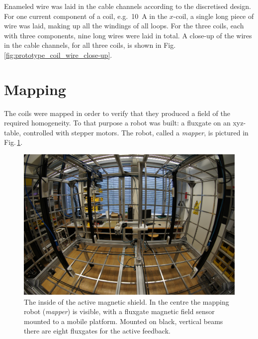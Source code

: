 Enameled wire was laid in the cable channels according to the discretised design.
For one current component of a coil, e.g.\ \SI[detect-all = true]{10}{\ampere} in the $x$-coil, a single long piece of wire was laid, making up all the windings of all loops.
For the three coils, each with three components, nine long wires were laid in total.
A close-up of the wires in the cable channels, for all three coils, is shown in Fig.\,\ref{fig:prototype_coil_wire_close-up}.




\section{Mapping}
\label{sec:prototype_mapping}
The coils were mapped in order to verify that they produced a field of the required homogeneity.
To that purpose a robot was built: a fluxgate on an xyz-table, controlled with stepper motors.
The robot, called a \emph{mapper}, is pictured in Fig.\,\ref{fig:prototype_photo_inside}.

\begin{figure}
  \centering
  \includegraphics[width=0.75\linewidth]{gfx/prototype/prototype_photo_inside.jpg}
  \caption{The inside of the active magnetic shield. In the centre the mapping robot (\emph{mapper}) is visible, with a fluxgate magnetic field sensor mounted to a mobile platform. Mounted on black, vertical beams there are eight fluxgates for the active feedback.}\label{fig:prototype_photo_inside}
\end{figure}

